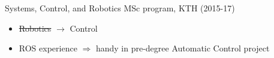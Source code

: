 \begin{frame}{Systems, Control, and Robotics MSc program, KTH (2015-17)}

  \begin{itemize}
    \item \sout{Robotics} $\rightarrow$ Control
    \item ROS experience $\Rightarrow$ handy in pre-degree Automatic Control project
  \end{itemize}

\end{frame}
